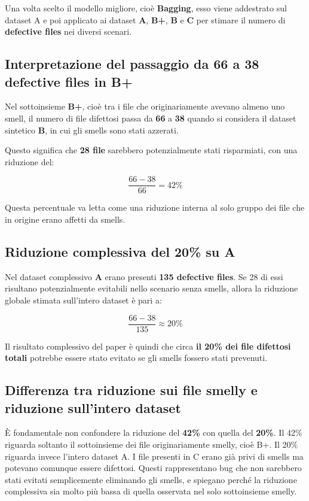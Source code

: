 Una volta scelto il modello migliore, cioè \textbf{Bagging}, esso viene addestrato sul dataset A e poi applicato ai dataset \textbf{A}, \textbf{B+}, \textbf{B} e \textbf{C} per stimare il numero di \textbf{defective files} nei diversi scenari.

\subsection{Interpretazione del passaggio da 66 a 38 defective files in B+}

Nel sottoinsieme \textbf{B+}, cioè tra i file che originariamente avevano almeno uno smell, il numero di file difettosi passa da \textbf{66} a \textbf{38} quando si considera il dataset sintetico \textbf{B}, in cui gli smells sono stati azzerati.

Questo significa che \textbf{28 file} sarebbero potenzialmente stati risparmiati, con una riduzione del:

\[
\frac{66 - 38}{66} = 42\%
\]

Questa percentuale va letta come una riduzione interna al solo gruppo dei file che in origine erano affetti da smells.

\subsection{Riduzione complessiva del 20\% su A}

Nel dataset complessivo \textbf{A} erano presenti \textbf{135 defective files}. Se 28 di essi risultano potenzialmente evitabili nello scenario senza smells, allora la riduzione globale stimata sull'intero dataset è pari a:

\[
\frac{66 - 38}{135} \approx 20\%
\]

Il risultato complessivo del paper è quindi che circa \textbf{il 20\% dei file difettosi totali} potrebbe essere stato evitato se gli smells fossero stati prevenuti.

\subsection{Differenza tra riduzione sui file smelly e riduzione sull'intero dataset}

\begin{notaprof}
È fondamentale non confondere la riduzione del \textbf{42\%} con quella del \textbf{20\%}. Il 42\% riguarda soltanto il sottoinsieme dei file originariamente smelly, cioè B+. Il 20\% riguarda invece l'intero dataset A. I file presenti in C erano già privi di smells ma potevano comunque essere difettosi. Questi rappresentano bug che non sarebbero stati evitati semplicemente eliminando gli smells, e spiegano perché la riduzione complessiva sia molto più bassa di quella osservata nel solo sottoinsieme smelly.
\end{notaprof}

